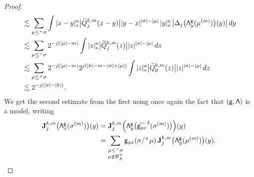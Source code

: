 \documentclass[10pt]{amsart}
\theoremstyle{plain}
\theoremstyle{definition}
\newcommand{\bfJ}{\mathbf{J}}
\newcommand{\sfg}{\mathsf{g}}
\newcommand{\mcB}{\mathcal{B}}
\begin{document}
\begin{proof}
\begin{align*}
&\lesssim\sum_{\mu\le^+\sigma}\int |x-y|_*^a \big|\widetilde{Q}_j^{k,m}(x-y)\big| |y-x|^{|\sigma|-|\mu|}\,|y|_*^a\,\big|\Delta_j\bigl({\sf\Lambda}^{\sfg}_y(\mu^{(m)})\bigr)(y)\big|\,dy \\
&\lesssim\sum_{\mu\le^+\sigma}2^{-j(|\mu|-m)} \int |z|_*^a\big|\widetilde{Q}_j^{k,m}(z)\big| |z|^{|\sigma|-|\mu|}\,dz \\
&\lesssim\sum_{\mu\le^+\sigma}2^{-j(|\mu|-m)}2^{j(|k|-m-|\sigma|+|\mu|)} \int |z|_*^a\big|\widetilde{Q}_0^{k,m}(z)\big| |z|^{|\sigma|-|\mu|}\,dz \\
&\lesssim2^{-j(|\sigma|-|k|)}.
\end{align*}
We get the second estimate from the first using once again the fact that ${\sf (g,\Lambda)}$ is a model, writing
\begin{align*}
\bfJ_j^{k,m}\bigl({\sf\Lambda}^{\sfg}_x(\sigma^{(m)})\bigr)(y) &= \bfJ_j^{k,m}\Bigl({\sf\Lambda}^{\sfg}_y\bigl(\widehat{{\sf g}_{yx}}^\delta (\sigma^{(m)})\bigr)\Bigr)(y)\\
&= \sum_{\substack{\mu\le^+\sigma\\\mu\notin\mcB_X^+}}\sfg_{yx}(\sigma/^+\mu)\,\bfJ_j^{k,m}\bigl({\sf\Lambda}^{\sfg}_y(\mu^{(m)})\bigr)(y).\qedhere
\end{align*}
\end{proof}
\end{document}
